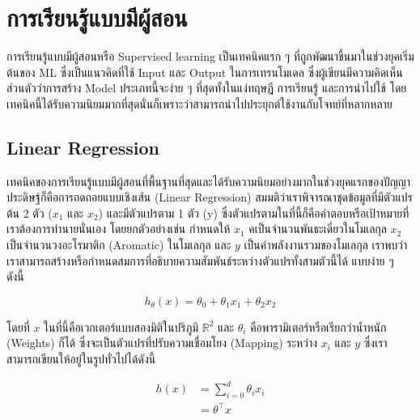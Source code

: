 

\chapter{การเรียนรู้แบบมีผู้สอน}
\label{ch:sup_ml}

การเรียนรู้แบบมีผู้สอนหรือ Supervised learning เป็นเทคนิคแรก ๆ ที่ถูกพัฒนาขึ้นมาในช่วงยุคเริ่มต้นของ ML ซึ่งเป็นแนวคิดที่ใช้ Input และ 
Output ในการเทรนโมเดล ซึ่งผู้เขียนมีความคิดเห็นส่วนตัวว่าการสร้าง Model ประเภทนี้จะง่าย ๆ ที่สุดทั้งในแง่ทฤษฎี การเรียนรู้ และการนำไปใช้ 
โดยเทคนิคนี้ได้รับความนิยมมากที่สุดนั่นก็เพราะว่าสามารถนำไปประยุกต์ใช้งานกับโจทย์ที่หลากหลาย

\section{Linear Regression}
\label{sec:lin_res}

เทคนิคของการเรียนรู้แบบมีผู้สอนที่พื้นฐานที่สุดและได้รับความนิยมอย่างมากในช่วงยุคแรกของปัญญาประดิษฐ์ก็คือการถดถอยแบบเชิงเส้น (Linear Regression)
สมมติว่าเราพิจารณาชุดข้อมูลที่มีตัวแปรต้น 2 ตัว ($x_{1}$ และ $x_{2}$) และมีตัวแปรตาม 1 ตัว (y) ซึ่งตัวแปรตามในที่นี้ก็คือคำตอบหรือเป้าหมายที่%
เราต้องการทำนายนั่นเอง โดยยกตัวอย่างเช่น กำหนดให้ $x_{1}$ คเป็นจำนวนพันธะเดี่ยวในโมเลกุล $x_{2}$ เป็นจำนวนวงอะโรมาติก (Aromatic)
ในโมเลกุล และ $y$ เป็นค่าพลังงานรวมของโมเลกุล เราพบว่าเราสามารถสร้างหรือกำหนดสมการที่อธิบายความสัมพันธ์ระหว่างตัวแปรทั้งสามตัวนี้ได้%
แบบง่าย ๆ ดังนี้

\begin{equation}
    h_\theta(x) = \theta_0 + \theta_1 x_1 + \theta_2 x_2
\end{equation}

\noindent โดยที่ $x$ ในที่นี้คือเวกเตอร์แบบสองมิติในปริภูมิ $\mathbb{R}^{2}$ และ $\theta_{i}$ คือพารามิเตอร์หรือเรียกว่าน้ำหนัก (Weights) ก็ได้ ซึ่งจะเป็นตัวแปรที่ปรับความเชื่อมโยง (Mapping) 
ระหว่าง $x_{i}$ และ $y$ ซึ่งเราสามารถเขียนให้อยู่ในรูปทั่วไปได้ดังนี้

\begin{align}
    h(x) &= \sum_{i=0}^{d} \theta_{i} x_{i} \\
         &= \theta^{\top} x
\end{align}

